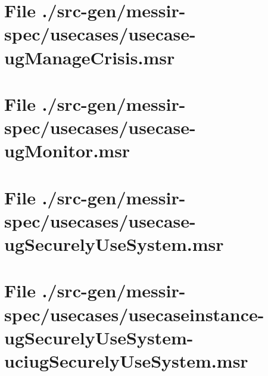 \section[File /src-gen/messir-spec/usecases/usecase-ugManageCrisis.msr]{File ./src-gen/messir-spec/usecases/usecase-ugManageCrisis.msr}
\scriptsize

\normalsize
	
\section[File /src-gen/messir-spec/usecases/usecase-ugMonitor.msr]{File ./src-gen/messir-spec/usecases/usecase-ugMonitor.msr}
\scriptsize

\normalsize
	
\section[File /src-gen/messir-spec/usecases/usecase-ugSecurelyUseSystem.msr]{File ./src-gen/messir-spec/usecases/usecase-ugSecurelyUseSystem.msr}
\scriptsize

\normalsize
	
\section[File /src-gen.../usecaseinstance-ugSecurelyUseSystem-uciugSecurelyUseSystem.msr]{File ./src-gen/messir-spec/usecases/usecaseinstance-ugSecurelyUseSystem-uciugSecurelyUseSystem.msr}
\scriptsize

\normalsize
	
